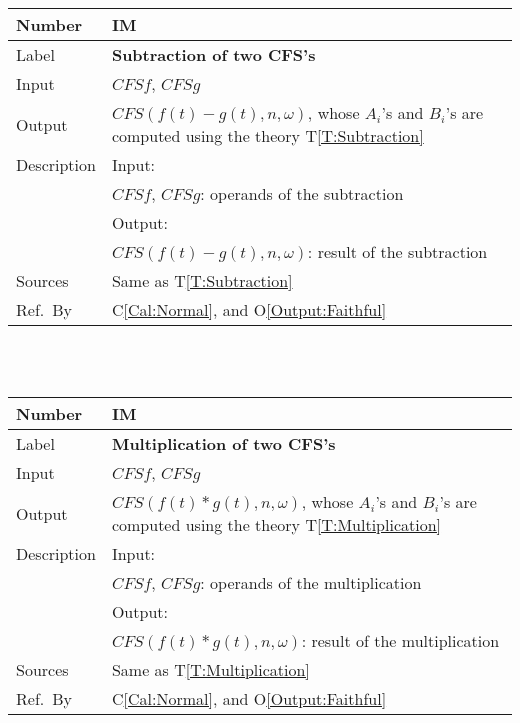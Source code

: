 \documentclass[12pt]{article}
\newcommand{\colAwidth}{0.13\textwidth}
\newcommand{\colBwidth}{0.82\textwidth}
\newcommand{\tref}[1]{T\ref{#1}}
\newcounter{instnum} %
\newcommand{\calref}[1]{C\ref{#1}}
\newcommand{\oref}[1]{O\ref{#1}}
\begin{document}
\noindent
\begin{minipage}{\textwidth}
	\renewcommand*{\arraystretch}{1.5}
	\begin{tabular}{| p{\colAwidth} | p{\colBwidth}|}
		\hline
		\rowcolor[gray]{0.9}
		Number& IM{instnum}\theinstnum 
		\label{IM:Subtraction}\\
		\hline
		Label& \bf Subtraction of two CFS's \\
		\hline
		Input& $\mathit{CFSf}$, $\mathit{CFSg}$\\
		\hline
		Output& $\mathit{CFS}(f(t)-g(t), n, \omega)$, whose $A_i$'s 
		and $B_i$'s are computed using the theory \tref{T:Subtraction}\\
		\hline
		Description&Input:\\
		&$\mathit{CFSf}$, $\mathit{CFSg}$: operands of the subtraction\\
		&Output:\\
		& $\mathit{CFS}(f(t)-g(t), n, \omega)$: result of the subtraction\\
		\hline
		Sources&Same as \tref{T:Subtraction}		\\
		\hline
		Ref.\ By &  \calref{Cal:Normal}, 
		and \oref{Output:Faithful}\\
		\hline
	\end{tabular}
\end{minipage}\\
~\newline

\noindent
\begin{minipage}{\textwidth}
	\renewcommand*{\arraystretch}{1.5}
	\begin{tabular}{| p{\colAwidth} | p{\colBwidth}|}
		\hline
		\rowcolor[gray]{0.9}
		Number& IM{instnum}\theinstnum 
		\label{IM:Multiplication}\\
		\hline
		Label& \bf Multiplication of two CFS's \\
		\hline
		Input& $\mathit{CFSf}$, $\mathit{CFSg}$\\
		\hline
		Output& $\mathit{CFS}(f(t)*g(t), n, \omega)$, whose $A_i$'s 
		and $B_i$'s are computed using the theory 
		\tref{T:Multiplication}\\
		\hline
		Description&Input:\\
		&$\mathit{CFSf}$, $\mathit{CFSg}$: operands of the 
		multiplication\\
		&Output:\\
		& $\mathit{CFS}(f(t)*g(t), n, \omega)$: result 
		of the multiplication\\
		\hline
		Sources&Same as \tref{T:Multiplication}\\
		\hline
		Ref.\ By &  \calref{Cal:Normal}, 
		and \oref{Output:Faithful}\\
		\hline
	\end{tabular}
\end{minipage}\\
~\newline
\end{document}
